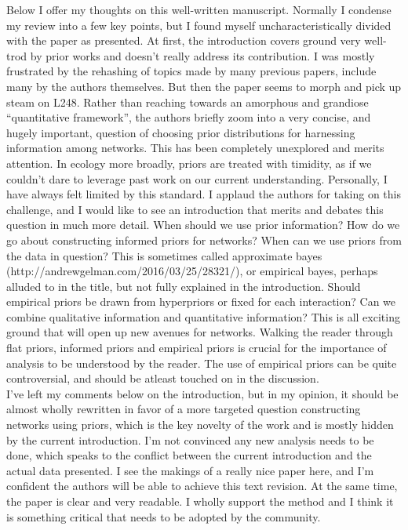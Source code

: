 \documentclass[12pt]{letter}
\newenvironment{refquote}{\bigskip \begin{it}}{\end{it}\smallskip}
\begin{document}
		\begin{refquote}
			Below I offer my thoughts on this well-written manuscript. Normally I condense my review into a few key points, but I found myself uncharacteristically divided with the paper as presented. At first, the introduction covers ground very well-trod by prior works and doesn’t really address its contribution. I was mostly frustrated by the rehashing of topics made by many previous papers, include many by the authors themselves. But then the paper seems to morph and pick up steam on L248. Rather than reaching towards an amorphous and grandiose “quantitative framework”, the authors briefly zoom into a very concise, and hugely important, question of choosing prior distributions for harnessing information among networks. This has been completely unexplored and merits attention. In ecology more broadly, priors are treated with timidity, as if we couldn’t dare to leverage past work on our current understanding. Personally, I have always felt limited by this standard. I applaud the authors for taking on this challenge, and I would like to see an introduction that merits and debates this question in much more detail. When should we use prior information? How do we go about constructing informed priors for networks? When can we use priors from the data in question? This is sometimes called approximate bayes (http://andrewgelman.com/2016/03/25/28321/), or empirical bayes, perhaps alluded to in the title, but not fully explained in the introduction. Should empirical priors be drawn from hyperpriors or fixed for each interaction? Can we combine qualitative information and quantitative information? This is all exciting ground that will open up new avenues for networks. Walking the reader through flat priors, informed priors and empirical priors is crucial for the importance of analysis to be understood by the reader. The use of empirical priors can be quite controversial, and should be atleast touched on in the discussion. \\
			I’ve left my comments below on the introduction, but in my opinion, it should be almost wholly rewritten in favor of a more targeted question constructing networks using priors, which is the key novelty of the work and is mostly hidden by the current introduction. I’m not convinced any new analysis needs to be done, which speaks to the conflict between the current introduction and the actual data presented. I see the makings of a really nice paper here, and I’m confident the authors will be able to achieve this text revision.
			\medskip
			At the same time, the paper is clear and very readable. I wholly support the method and I think it is something critical that needs to be adopted by the community. \\

\end{refquote}
\end{document}
